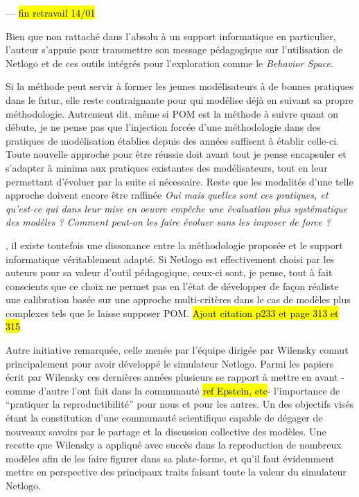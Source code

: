 --- \hl{fin retravail 14/01}

Bien que non rattaché dans l'absolu à un support informatique en particulier, l'auteur s'appuie pour transmettre son message pédagogique sur l'utilisation de Netlogo et de ces outils intégrés pour l'exploration comme le \textit{Behavior Space}.

Si la méthode peut servir à former les jeunes modélisateurs à de bonnes pratiques dans le futur, elle reste contraignante pour qui modélise déjà en suivant sa propre méthodologie. Autrement dit, même si POM est la méthode à suivre quant on débute, je ne pense pas que l'injection forcée d'une méthodologie dans des pratiques de modélisation établies depuis des années suffisent à établir celle-ci. Toute nouvelle approche pour être réussie doit avant tout je pense encapsuler et s'adapter à minima aux pratiques existantes des modélisateurs, tout en leur permettant d'évoluer par la suite si nécessaire. Reste que les modalités d'une telle approche doivent encore être raffinée \textit{Oui mais quelles sont ces pratiques, et qu'est-ce qui dans leur mise en oeuvre empêche une évaluation plus systématique des modèles ? Comment peut-on les faire évoluer sans les imposer de force ?}

, il existe toutefois une dissonance entre la méthodologie proposée et le support informatique véritablement adapté. Si Netlogo est effectivement choisi par les auteurs pour sa valeur d'outil pédagogique, ceux-ci sont, je pense, tout à fait conscients que ce choix ne permet pas en l'état de développer de façon réaliste une calibration basée sur une approche multi-critères dans le cas de modèles plus complexes tels que le laisse supposer POM. \hl{Ajout citation p233 et page 313 et 315}

Autre initiative remarquée, celle menée par l'équipe dirigée par Wilensky connut principalement pour avoir développé le simulateur Netlogo. Parmi les papiers écrit par Wilensky ces dernières années \autocite{Wilensky2007a} plusieurs se rapport à mettre en avant - comme d'autre l'ont fait dans la communauté \hl{ref Epstein, etc}- l'importance de \enquote{pratiquer la reproductibilité} pour nous et pour les autres. Un des objectifs visés étant la constitution d'une communauté scientifique capable de dégager de nouveaux savoirs par le partage et la discussion collective des modèles. Une recette que Wilensky a appliqué avec succès dans la reproduction de nombreux modèles afin de les faire figurer dans sa plate-forme, et qu'il faut évidemment mettre en perspective des principaux traits faisant toute la valeur du simulateur Netlogo. 

